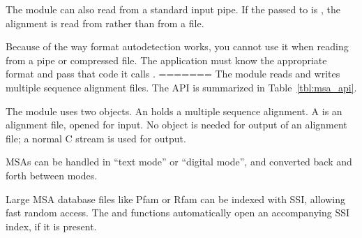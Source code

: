 The module can also read from a standard input pipe. If the
 passed to  is \ccode{-},
the alignment is read from  rather than from a file.

Because of the way format autodetection works, you cannot use it when
reading from a pipe or compressed file. The application must know the
appropriate format and pass that code it calls
.
=======
The  module reads and writes multiple sequence alignment
files. The API is summarized in Table~\ref{tbl:msa_api}.

The module uses two objects. An  holds a multiple
sequence alignment. A  is an alignment file,
opened for input. No object is needed for output of an alignment file;
a normal C  stream is used for output.  

MSAs can be handled in ``text mode'' or ``digital mode'', and
converted back and forth between modes.

Large MSA database files like Pfam or Rfam can be indexed with SSI,
allowing fast random access.  The  and
 functions automatically open an
accompanying SSI index, if it is present.

